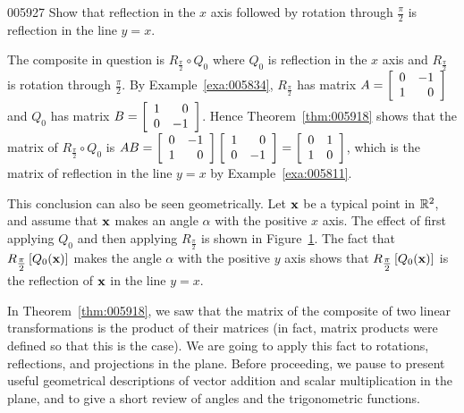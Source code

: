 \begin{example}{}{005927}
Show that reflection in the $x$ axis followed by rotation through $\frac{\pi}{2}$ is reflection in the line $y = x$.

\begin{solution}
  The composite in question is $R_{\frac{\pi}{2}} \circ Q_{0}$ where $Q_{0}$ is reflection in the $x$ axis and $R_{\frac{\pi}{2}}$ is rotation through $\frac{\pi}{2}$. By Example~\ref{exa:005834}, $R_{\frac{\pi}{2}}$ has matrix $A = \left[ \begin{array}{rr}
 0 & -1 \\
 1 & 0
 \end{array} \right]$
 and $Q_{0}$ has matrix $B = \left[ \begin{array}{rr}
 1 & 0 \\
 0 & -1
 \end{array} \right]$.
 Hence Theorem~\ref{thm:005918} shows that the matrix of $R_{\frac{\pi}{2}} \circ Q_{0}$
 is $AB = \left[ \begin{array}{rr}
 0 & -1 \\
 1 & 0
 \end{array} \right] \left[ \begin{array}{rr}
 1 & 0 \\
 0 & -1
 \end{array} \right] = \left[ \begin{array}{rr}
 0 & 1 \\
 1 & 0
 \end{array} \right]$, which is the matrix of reflection in the line $y = x$ by Example~\ref{exa:005811}.
\end{solution}
\end{example}

This conclusion can also be seen geometrically. Let $\textbf{x}$ be a typical point in $\mathbb{R}^2$, and assume that $\textbf{x}$ makes an angle $\alpha$ with the positive $x$ axis. The effect of first applying $Q_{0}$ and then applying $R_{\frac{\pi}{2}}$ is shown in Figure~\ref{fig:005950}. The fact that $R_{\tfrac{\pi}{2}}\left[Q_{0}(\textbf{x})\right]$ makes the angle $\alpha$ with the positive $y$ axis shows that $R_{\tfrac{\pi}{2}}\left[Q_{0}(\textbf{x})\right]$ is the reflection of $\textbf{x}$ in the line $y = x$.

\begin{figure}[H]
\vspace*{-1em}
\centering

\caption{\label{fig:005950}}
\end{figure}
\vspace{-1em}
In Theorem~\ref{thm:005918}, we saw that the matrix of the composite of two linear transformations is the product of their matrices (in fact, matrix products were defined so that this is the case). We are going to apply this fact to rotations, reflections, and projections in the plane. Before proceeding, we pause to present useful geometrical descriptions of vector addition and scalar multiplication in the plane, and to give a short review of angles and the trigonometric functions.

